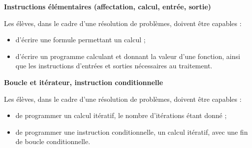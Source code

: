 \documentclass[10pt,openright,twoside]{book}
\begin{document}
\begin{center}
{\fontsize{9}{11}\selectfont
{\Large {}}}
\end{center}\bigskip


\noindent\textbf{Instructions élémentaires (affectation, calcul, entrée, sortie)}\par
Les élèves, dans le cadre d'une résolution de problèmes, doivent être capables :
\begin{itemize}
    \item d'écrire une formule permettant un calcul ;
    \item d'écrire un programme calculant et donnant la valeur d'une fonction, ainsi que les instructions d'entrées et sorties nécessaires au traitement.
\end{itemize}

\noindent\textbf{Boucle et itérateur, instruction conditionnelle}\par
Les élèves, dans le cadre d'une résolution de problèmes, doivent être capables :
\begin{itemize}
    \item de programmer un calcul itératif, le nombre d'itérations étant donné ;
    \item de programmer une instruction conditionnelle, un calcul itératif, avec une fin de boucle conditionnelle.
\end{itemize}
\end{document}
